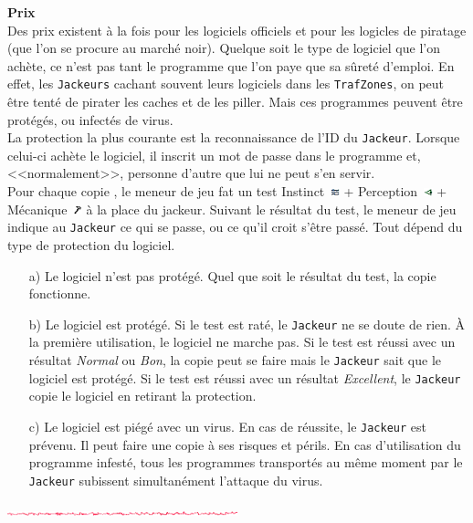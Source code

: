 \documentclass[11pt,twoside,a4paper]{article}
\def\imgINSTI{\includegraphics[width=0.25cm]{../../../../../imgGraphics/rolePlayingGame/SimulacreS/mini12x12/instinct.png} }
\def\imgPERCE{\includegraphics[width=0.25cm]{../../../../../imgGraphics/rolePlayingGame/SimulacreS/mini12x12/perception.png} }
\def\imgMECAN{\includegraphics[width=0.25cm]{../../../../../imgGraphics/rolePlayingGame/SimulacreS/mini12x12/mecanique.png} }
\def\barreCyberAgeHalf{\includegraphics[width=0.50\textwidth]{img/Filet_CA.png}}
\begin{document}
\begin{multicols*}{2}
\textbf{Prix}~\\
Des prix existent {\`a} la fois pour les logiciels officiels et pour les logicles de piratage (que l'on se procure au march{\'e} noir). Quelque soit le type de logiciel que l'on ach{\`e}te, ce n'est pas tant le programme que l'on paye que sa s{\^u}ret{\'e} d'emploi. En effet, les \texttt{Jackeurs} cachant souvent leurs logiciels dans les \texttt{TrafZones}, on peut {\^e}tre tent{\'e} de pirater les caches et de les piller. Mais ces programmes peuvent {\^e}tre prot{\'e}g{\'e}s, ou infect{\'e}s de virus. ~\\
La protection la plus courante est la reconnaissance de l'ID du \texttt{Jackeur}. Lorsque celui-ci ach{\`e}te le logiciel, il inscrit un mot de passe dans le programme et, <<normalement>>, personne d'autre que lui ne peut s'en servir. ~\\
Pour chaque copie , le meneur de jeu fat un test Instinct~\imgINSTI  + Perception~\imgPERCE  + M{\'e}canique~\imgMECAN  {\`a} la place du jackeur. Suivant le r{\'e}sultat du test, le meneur de jeu indique au \texttt{Jackeur} ce qui se passe, ou ce qu'il croit s'{\^e}tre pass{\'e}. Tout d{\'e}pend du type de protection du logiciel. 
\begin{itemize}
	\item[a)] Le logiciel n'est pas prot{\'e}g{\'e}. Quel que soit le r{\'e}sultat du test, la copie fonctionne. 
	\item[b)] Le logiciel est prot{\'e}g{\'e}. Si le test est rat{\'e}, le \texttt{Jackeur} ne se doute de rien. {\`A} la premi{\`e}re utilisation, le logiciel ne marche pas. Si le test est r{\'e}ussi avec un r{\'e}sultat \emph{Normal} ou \emph{Bon}, la copie peut se faire mais le \texttt{Jackeur} sait que le logiciel est prot{\'e}g{\'e}. Si le test est r{\'e}ussi avec un r{\'e}sultat \emph{Excellent}, le \texttt{Jackeur} copie le logiciel en retirant la protection. ~\\
	\item[c)] Le logiciel est pi{\'e}g{\'e} avec un virus. En cas de r{\'e}ussite, le \texttt{Jackeur} est pr{\'e}venu. Il peut faire une copie {\`a} ses risques et p{\'e}rils. En cas d'utilisation du programme infest{\'e}, tous les programmes transport{\'e}s au m{\^e}me moment par le \texttt{Jackeur} subissent simultan{\'e}ment l'attaque du virus. 
\end{itemize} %

\barreCyberAgeHalf %


\end{multicols*}
\end{document}

